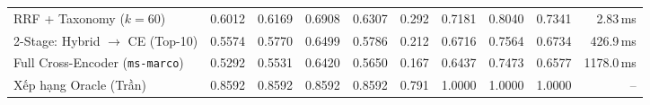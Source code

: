 \begin{table}[tbp]
{\begin{tabular}{lrrrrrrrrr}
RRF + Taxonomy ($k=60$) & 0.6012 & 0.6169 & 0.6908 & 0.6307 & 0.292 & 0.7181 & 0.8040 & 0.7341 & 2.83\,ms \\
2-Stage: Hybrid $\rightarrow$ CE (Top-10) & 0.5574 & 0.5770 & 0.6499 & 0.5786 & 0.212 & 0.6716 & 0.7564 & 0.6734 & 426.9\,ms \\
Full Cross-Encoder (\texttt{ms-marco}) & 0.5292 & 0.5531 & 0.6420 & 0.5650 & 0.167 & 0.6437 & 0.7473 & 0.6577 & 1178.0\,ms \\
Xếp hạng Oracle (Trần) & 0.8592 & 0.8592 & 0.8592 & 0.8592 & 0.791 & 1.0000 & 1.0000 & 1.0000 & -- \\
\bottomrule
\end{tabular}%
}
\end{table}
